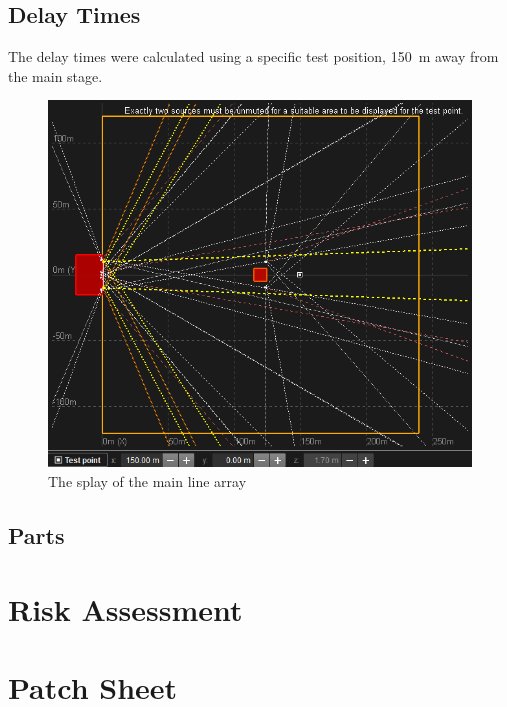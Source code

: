 \documentclass{BCUReport}
\begin{document}
\begin{appendices}
            \label{appendix:speaker_rigging}
            
        
        \subsection{Delay Times}
        The delay times were calculated using a specific test position, \SI{150}{\metre} away from the main stage.
        \begin{figure}[H]
            \centering
            \includegraphics{Images/test_position.png}
            \caption{The splay of the main line array}
            \label{fig:speaker_test_pos}
        \end{figure}
        
            \label{appendix:speaker_delays}
            
            
        \subsection{Parts}
            \label{appendix:speaker_parts}
            
            
    \section{Risk Assessment}
        \label{appendix:risk_assessment}
        

    \section{Patch Sheet}
        \label{appendix:patch_sheet}
        

\end{appendices}
\end{document}
